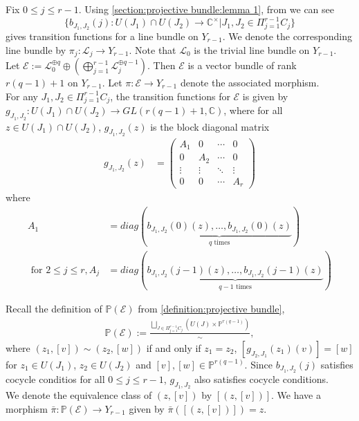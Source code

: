 \documentclass[12pt,reqno]{amsart}
\numberwithin{equation}{section}
\theoremstyle{definition}
\begin{document}
	Fix $0\leq j\leq r-1$. Using \cref{section:projective bundle:lemma 1}, from \cite[section 1.3]{LePotier} we can see
	$$\{b_{J_{1},J_{2}}(j):U(J_{1})\cap U(J_{2})\longrightarrow\mathbb{C}^{\times}|J_{1},J_{2}\in\Pi_{j=1}^{r-1}C_{j}\}$$ gives transition functions for a line bundle on $Y_{r-1}$. We denote the corresponding line bundle by $\pi_{j}:\mathcal{L}_{j}\longrightarrow Y_{r-1}$.
	Note that $\mathcal{L}_{0}$ is the trivial line bundle on $Y_{r-1}$.\\
	Let $\mathcal{E}:=\mathcal{L}_{0}^{\oplus q}\oplus(\bigoplus_{j=1}^{r-1} \mathcal{L}_{j}^{\oplus q-1})$. Then $\mathcal{E}$ is a vector bundle of rank $r(q-1)+1$ on $Y_{r-1}$. Let $\pi:\mathcal{E}\longrightarrow Y_{r-1}$ denote the associated morphism. \\
	For any $J_{1},J_{2}\in\Pi_{j=1}^{r-1}C_{j}$, the transition functions for $\mathcal{E}$ is given by $g_{J_{1},J_{2}}:U(J_{1})\cap U(J_{2})\longrightarrow GL(r(q-1)+1,\mathbb{C})$, where for all  $z\in U(J_{1})\cap U(J_{2})$,
	$g_{J_{1},J_{2}}(z)$ is the block diagonal matrix  
	\begin{align}\label{eq 6.1.10}
		g_{J_{1},J_{2}}(z)&=
\begin{pmatrix}
	A_1 & 0   & \cdots & 0 \\
	0   & A_2 & \cdots & 0 \\
	\vdots & \vdots & \ddots & \vdots \\
	0   & 0   & \cdots & A_r
\end{pmatrix}\end{align}
	where \begin{align}
		A_{1}&=diag(\underbrace{b_{J_{1},J_{2}}(0)(z),\ldots,b_{J_{1},J_{2}}(0)(z)}_{\text{$q$ times}})\label{eq 6.1.11}\\
		\text{\ for $2\leq j\leq r$}, A_{j}&=diag(\underbrace{b_{J_{1},J_{2}}(j-1)(z),\ldots,b_{J_{1},J_{2}}(j-1)(z)}_{\text{$q-1$ times}})\label{eq 6.1.12}
	\end{align}
	
	
	
	Recall the definition of $\mathbb{P}(\mathcal{E})$ from \cref{definition:projective bundle},
	\begin{align}\label{eq:definiton P(E)}
		\mathbb{P}(\mathcal{E}):=\frac{\bigsqcup_{J\in \Pi_{j=1}^{r-1}C_{j}}(U(J)\times\mathbb{P}^{r(q-1)})}{\sim},
	\end{align} 
	where $(z_{1},[v])\sim(z_{2},[w])$ if and only if $z_{1}=z_{2}$, $[g_{J_{2},J_{1}}(z_{1})(v)]=[w]$ for $z_{1}\in U(J_{1})$, $z_{2}\in U(J_{2})$ and $[v],[w]\in\mathbb{P}^{r(q-1)}$. Since $b_{J_{1},J_{2}}(j)$ satisfies cocycle conditios for all $0\leq j\leq r-1$, $g_{J_{1},J_{2}}$ also satisfies cocycle conditions.\\ We denote the equivalence class of $(z,[v])$ by $[(z,[v])]$. We have a morphism $\bar{\pi}:\mathbb{P}(\mathcal{E})\longrightarrow Y_{r-1}$ given by $\bar{\pi}([(z,[v])])=z$.
	
\end{document}
